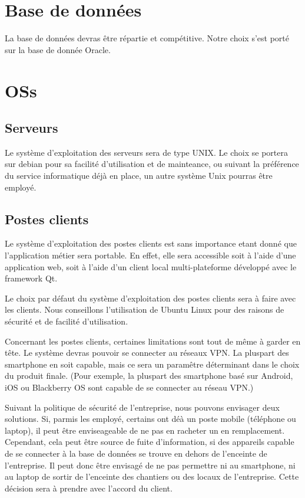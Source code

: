 \section{Base de données}
    La base de données devras être répartie et compétitive.
    Notre choix s'est porté sur la base de donnée Oracle.

\section{OSs}
    \subsection{Serveurs}
        Le système d'exploitation des serveurs sera de type UNIX.
        Le choix se portera sur debian pour sa facilité d'utilisation et de mainteance, ou suivant la préférence du service informatique déjà en place, un autre système Unix pourras être employé.
    \subsection{Postes clients}
        Le système d'exploitation des postes clients est sans importance etant donné que l'application métier sera portable.
        En effet, elle sera accessible soit à l'aide d'une application web, soit à l'aide d'un client local multi-plateforme développé avec le framework Qt.

        Le choix par défaut du système d'exploitation des postes clients sera à faire avec les clients.
        Nous conseillons l'utilisation de Ubuntu Linux pour des raisons de sécurité et de facilité d'utilisation.

        Concernant les postes clients, certaines limitations sont tout de même à garder en tête.
        Le système devras pouvoir se connecter au réseaux VPN.
        La pluspart des smartphone en soit capable, mais ce sera un paramêtre déterminant dans le choix du produit finale.
        (Pour exemple, la pluspart des smartphone basé sur Android, iOS ou Blackberry OS sont capable de se connecter au réseau VPN.)

        Suivant la politique de sécurité de l'entreprise, nous pouvons envisager deux solutions.
        Si, parmis les employé, certains ont déà un poste mobile (téléphone ou laptop), il peut être enviseageable de ne pas en racheter un en remplacement. Cependant, cela peut être source de fuite d'information, si des appareils capable de se connecter à la base de données se trouve en dehors de l'enceinte de l'entreprise.
        Il peut donc être envisagé de ne pas permettre ni au smartphone, ni au laptop de sortir de l'enceinte des chantiers ou des locaux de l'entreprise.
        Cette décision sera à prendre avec l'accord du client.
